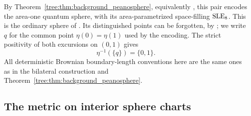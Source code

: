 By Theorem~\ref{tree:thm:background_peanosphere}, equivalently
\cite[Theorem~1.1]{MillerSheffieldSphere}, this pair encodes the area-one quantum
sphere, with its area-parametrized space-filling $\mathrm{SLE}_8$.  This is the
ordinary sphere of \cite[Definition~4.21(ii)]{DMS}.  Its distinguished
points can be forgotten, by \cite[Proposition~A.13]{DMS}; we write $q$
for the common point $\eta(0)=\eta(1)$ used by the encoding.  The
strict positivity of both excursions on $(0,1)$ gives
\begin{equation}\label{tree:eq:sphere_single_endpoint}
                      \eta^{-1}(\{q\})=\{0,1\}.
\end{equation}
All deterministic Brownian boundary-length conventions here are the same
ones as in the bilateral construction and
Theorem~\ref{tree:thm:background_peanosphere}.

\subsection{The metric on interior sphere charts}

